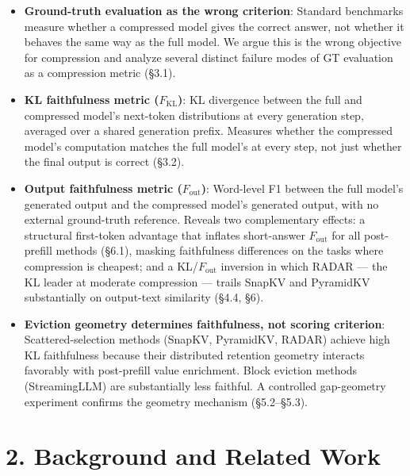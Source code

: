 \documentclass[10pt,letterpaper]{article}
\begin{document}
\begin{itemize}
\item
  \textbf{Ground-truth evaluation as the wrong criterion}: Standard
  benchmarks measure whether a compressed model gives the correct
  answer, not whether it behaves the same way as the full model. We
  argue this is the wrong objective for compression and analyze several
  distinct failure modes of GT evaluation as a compression metric
  (§3.1).
\item
  \textbf{KL faithfulness metric (\(F_{\text{KL}}\))}: KL divergence
  between the full and compressed model's next-token distributions at
  every generation step, averaged over a shared generation prefix.
  Measures whether the compressed model's computation matches the full
  model's at every step, not just whether the final output is correct
  (§3.2).
\item
  \textbf{Output faithfulness metric (\(F_{\text{out}}\))}: Word-level
  F1 between the full model's generated output and the compressed
  model's generated output, with no external ground-truth reference.
  Reveals two complementary effects: a structural first-token advantage
  that inflates short-answer \(F_{\text{out}}\) for all post-prefill methods
  (§6.1), masking faithfulness differences on the tasks where compression
  is cheapest; and a KL/\(F_{\text{out}}\) inversion in which RADAR ---
  the KL leader at moderate compression --- trails SnapKV and PyramidKV
  substantially on output-text similarity (§4.4, §6).
\item
  \textbf{Eviction geometry determines faithfulness, not scoring criterion}:
  Scattered-selection methods (SnapKV, PyramidKV, RADAR) achieve high KL
  faithfulness because their distributed retention geometry interacts
  favorably with post-prefill value enrichment. Block eviction methods
  (StreamingLLM) are substantially less faithful. 
  A controlled gap-geometry experiment confirms the geometry
  mechanism (§5.2--§5.3).
\end{itemize}

\hypertarget{background-and-related-work}{%
\section{2. Background and Related
Work}\label{background-and-related-work}}
\end{document}
